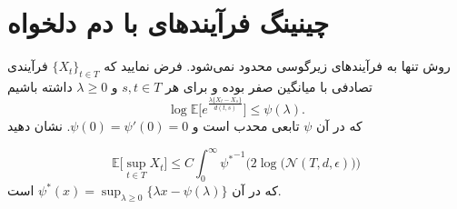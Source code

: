 \section
[دم دلخواه!]
{چینینگ فرآیند‌های با دم دلخواه}
روش 
تنها به فرآیند‌های زیرگوسی محدود نمی‌شود. فرض نمایید که 
$\{X_t\}_{t \in T}$
فرآیندی تصادفی با میانگین صفر بوده و برای هر 
$s, t \in T$
و
$\lambda \geq 0$
داشته باشیم
$$\log\mathbb{E}\Big[e^{\frac{\lambda \{X_t - X_s\}}{d(t, s)}}\Big] \leq \psi(\lambda).$$
که در آن 
$\psi$
تابعی محدب است و 
$\psi(0) = \psi'(0) = 0$.
نشان دهید 

$$\mathbb{E}\Big[\sup_{t \in T} X_t\Big] \leq C \int_{0}^{\infty} {\psi^*}^{-1} \Big(2\log\big(\mathcal{N}(T, d, \epsilon) \big)\Big)$$
که در آن
$\psi^*(x) = \sup_{\lambda \geq 0} \{\lambda x - \psi(\lambda)\}$
است.